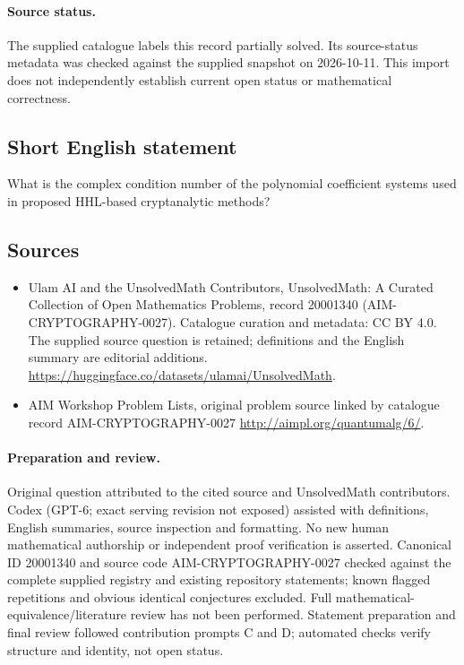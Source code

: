 \documentclass[11pt]{article}
\begin{document}
\paragraph{Source status.}
The supplied catalogue labels this record partially solved. Its source-status metadata was checked against the supplied snapshot on 2026-10-11. This import does not independently establish current open status or mathematical correctness.
\subsection{Short English statement}
What is the complex condition number of the polynomial coefficient systems used in proposed HHL-based cryptanalytic methods?
\subsection{Sources}
\begin{itemize}
\item[S1] Ulam AI and the UnsolvedMath Contributors, UnsolvedMath: A Curated Collection of Open Mathematics Problems, record 20001340 (AIM-CRYPTOGRAPHY-0027). Catalogue curation and metadata: CC BY 4.0. The supplied source question is retained; definitions and the English summary are editorial additions.
\url{https://huggingface.co/datasets/ulamai/UnsolvedMath}.
\item[S2] AIM Workshop Problem Lists, original problem source linked by catalogue record AIM-CRYPTOGRAPHY-0027
\url{http://aimpl.org/quantumalg/6/}.
\end{itemize}
\paragraph{Preparation and review.}
Original question attributed to the cited source and UnsolvedMath contributors. Codex (GPT-6; exact serving revision not exposed) assisted with definitions, English summaries, source inspection and formatting. No new human mathematical authorship or independent proof verification is asserted. Canonical ID 20001340 and source code AIM-CRYPTOGRAPHY-0027 checked against the complete supplied registry and existing repository statements; known flagged repetitions and obvious identical conjectures excluded. Full mathematical-equivalence/literature review has not been performed. Statement preparation and final review followed contribution prompts C and D; automated checks verify structure and identity, not open status.
\label{end:20001340}
\end{document}
